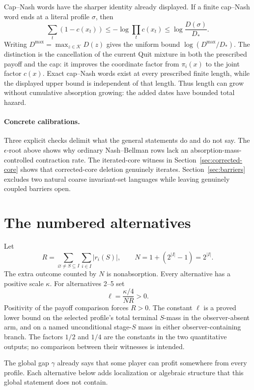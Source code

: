 \documentclass[11pt]{article}
\newcommand{\K}{\mathcal K}
\begin{document}
Cap--Nash words have the sharper identity already displayed.  If a finite
cap--Nash word ends at a literal profile $\sigma$, then
\[
 \sum_t(1-c(x_t))
 \le-\log\prod_t c(x_t)
 \le\log\frac{D(\sigma)}{D_*}.
\]
Writing $D^{\max}=\max_{z\in\K}D(z)$ gives the uniform bound
$\log(D^{\max}/D_*)$.  The distinction is the cancellation of the current
Quit mixture in both the prescribed payoff and the cap: it improves the
coordinate factor from $\pi_i(x)$ to the joint factor $c(x)$.  Exact
cap--Nash words exist at every prescribed finite length, while the displayed
upper bound is independent of that length.  Thus length can grow without
cumulative absorption growing: the added dates have bounded total hazard.

\paragraph{Concrete calibrations.}
Three explicit checks delimit what the general statements do and do not say.
The $\epsilon$-root above shows why ordinary Nash--Bellman rows lack an
absorption-mass-controlled contraction rate.  The iterated-core witness in
Section~\ref{sec:corrected-core} shows that corrected-core deletion genuinely
iterates.  Section~\ref{sec:barriers} excludes two natural coarse invariant-set
languages while leaving genuinely coupled barriers open.

\section{The numbered alternatives}
\label{sec:five-alternatives}

Let
\[
 R=\sum_{\varnothing\ne S\subseteq I}\sum_{i\in I}|r_i(S)|,
 \qquad
 N=1+(2^{|I|}-1)=2^{|I|}.
\]
The extra outcome counted by $N$ is nonabsorption.
Every alternative has a positive scale $\kappa$.  For alternatives 2--5 set
\[
 \ell=\frac{\kappa/4}{NR}>0.
\]
Positivity of the payoff comparison forces $R>0$.  The constant $\ell$ is a
proved lower bound on the selected profile's total terminal $S$-mass in the
observer-absent arm, and on a named unconditional stage-$S$ mass in either
      observer-containing branch.  The factors $1/2$ and $1/4$ are the constants
in the two quantitative outputs; no comparison between their witnesses is
intended.

The global gap $\gamma$ already says that some player can profit somewhere
from every profile.  Each alternative below adds localization or algebraic
structure that this global statement does not contain.
\end{document}
